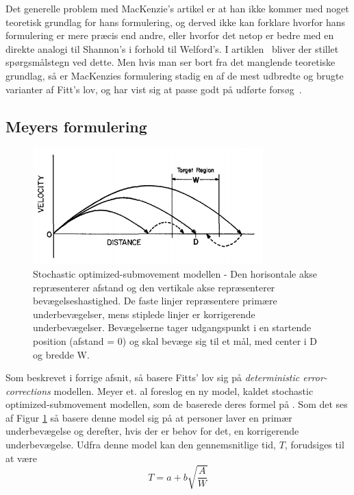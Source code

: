 Det generelle problem med MacKenzie's artikel er at han ikke kommer med noget teoretisk grundlag for hans formulering, og derved ikke kan forklare hvorfor hans formulering er mere præcis end andre, eller hvorfor det netop er bedre med en direkte analogi til Shannon's i forhold til Welford's. I artiklen~\cite{drewes2010} bliver der stillet spørgsmålstegn ved dette. Men hvis man ser bort fra det manglende teoretiske grundlag, så er MacKenzies formulering stadig en af de mest udbredte og brugte varianter af Fitt's lov, og har vist sig at passe godt på udførte forsøg~\cite{goldberg2015}.

\subsection*{Meyers formulering}
\begin{figure}[h]
\centering
\includegraphics[width=.5\linewidth]{images/illustrations/base_model_meyer}
\caption{Stochastic optimized-submovement modellen - Den horisontale akse repræsenterer afstand og den vertikale akse repræsenterer bevægelseshastighed. De faste linjer repræsentere primære underbevægelser, mens stiplede linjer er korrigerende underbevægelser. Bevægelserne tager udgangspunkt i en startende position (afstand = 0) og skal bevæge sig til et mål, med center i D og bredde W.}
\label{fig:MeyerTheory}
\end{figure}
Som beskrevet i forrige afsnit, så basere Fitts' lov sig på \emph{deterministic error-corrections} modellen. Meyer et. al foreslog en ny model, kaldet stochastic optimized-submovement modellen, som de baserede deres formel på \cite{meyer1988}. Som det ses af Figur \ref{fig:MeyerTheory} så basere denne model sig på at personer laver en primær underbevægelse og derefter, hvis der er behov for det, en korrigerende underbevægelse. Udfra denne model kan den gennemsnitlige tid, $T$, forudsiges til at være
\begin{equation}
\label{eq:meyer}
T = a + b \sqrt{\frac{A}{W}}
\end{equation}

